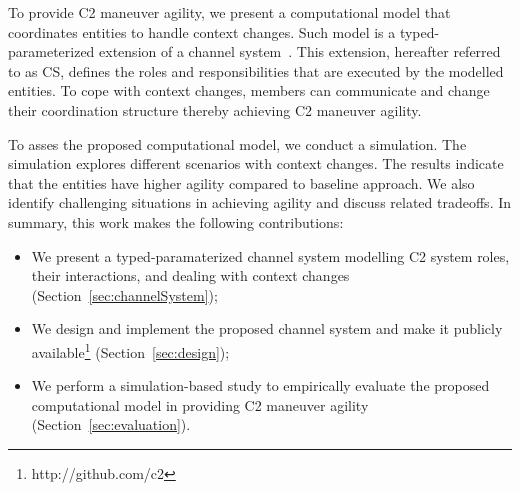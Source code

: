 
To provide C2 maneuver agility, we present a computational model that coordinates entities to handle context changes. Such model is a typed-parameterized extension of a channel system~\citep{modelcheckingBaier}. This extension, hereafter referred to as CS, defines the roles and responsibilities that are executed by the modelled entities. To cope with context changes, members can communicate and change their coordination structure thereby achieving C2 maneuver agility.


To asses the proposed computational model, we conduct a simulation. The simulation explores different scenarios with context changes. The results indicate that the entities have higher agility compared to baseline approach. We also identify challenging situations in achieving agility and discuss related tradeoffs. In summary, this work makes the following contributions:

\begin{itemize}
    \item We present a typed-paramaterized channel system modelling C2 system roles, their interactions, and dealing with context changes (Section~\ref{sec:channelSystem});
    \item We design and implement the proposed channel system and make it  publicly available\footnote{http://github.com/c2} (Section~\ref{sec:design});
    \item We perform a simulation-based study to empirically evaluate the proposed computational model in providing C2 maneuver agility (Section~\ref{sec:evaluation}). 
\end{itemize}
